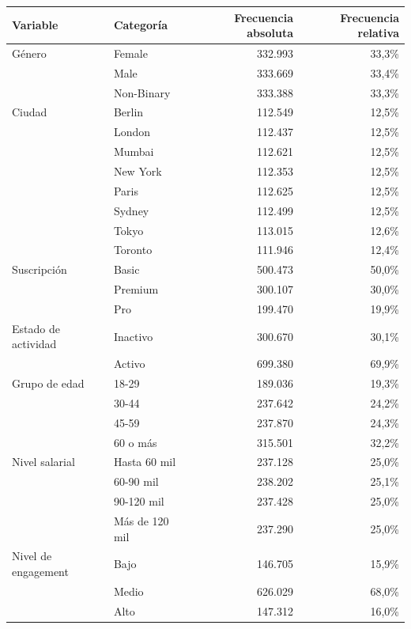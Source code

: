 \begin{tabular}{llrr}
\toprule
Variable & Categoría & Frecuencia absoluta & Frecuencia relativa \\
\midrule
Género & Female & 332.993 & 33,3\% \\
 & Male & 333.669 & 33,4\% \\
 & Non-Binary & 333.388 & 33,3\% \\
Ciudad & Berlin & 112.549 & 12,5\% \\
 & London & 112.437 & 12,5\% \\
 & Mumbai & 112.621 & 12,5\% \\
 & New York & 112.353 & 12,5\% \\
 & Paris & 112.625 & 12,5\% \\
 & Sydney & 112.499 & 12,5\% \\
 & Tokyo & 113.015 & 12,6\% \\
 & Toronto & 111.946 & 12,4\% \\
Suscripción & Basic & 500.473 & 50,0\% \\
 & Premium & 300.107 & 30,0\% \\
 & Pro & 199.470 & 19,9\% \\
Estado de actividad & Inactivo & 300.670 & 30,1\% \\
 & Activo & 699.380 & 69,9\% \\
Grupo de edad & 18-29 & 189.036 & 19,3\% \\
 & 30-44 & 237.642 & 24,2\% \\
 & 45-59 & 237.870 & 24,3\% \\
 & 60 o más & 315.501 & 32,2\% \\
Nivel salarial & Hasta 60 mil & 237.128 & 25,0\% \\
 & 60-90 mil & 238.202 & 25,1\% \\
 & 90-120 mil & 237.428 & 25,0\% \\
 & Más de 120 mil & 237.290 & 25,0\% \\
Nivel de engagement & Bajo & 146.705 & 15,9\% \\
 & Medio & 626.029 & 68,0\% \\
 & Alto & 147.312 & 16,0\% \\
\bottomrule
\end{tabular}
